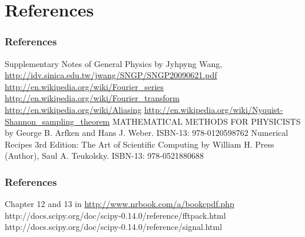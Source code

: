 \documentclass{beamer}
\begin{document}
\section{References}
\begin{frame}
\frametitle{References}
\begin{thebibliography}{7}
 Supplementary Notes of General Physics by Jyhpyng Wang, \url{http://idv.sinica.edu.tw/jwang/SNGP/SNGP20090621.pdf}
 \url{http://en.wikipedia.org/wiki/Fourier_series}
 \url{http://en.wikipedia.org/wiki/Fourier_transform}
 \url{http://en.wikipedia.org/wiki/Aliasing}
 \url{http://en.wikipedia.org/wiki/Nyquist-Shannon_sampling_theorem}
 MATHEMATICAL METHODS FOR PHYSICISTS by George B. Arfken and Hans J. Weber. ISBN-13: 978-0120598762
 Numerical Recipes 3rd Edition: The Art of Scientific Computing by William H. Press  (Author), Saul A. Teukolsky. ISBN-13: 978-0521880688
\end{thebibliography}
\end{frame}
\begin{frame}
\frametitle{References}
\begin{thebibliography}{3}
 Chapter 12 and 13 in \url{http://www.nrbook.com/a/bookcpdf.php}
http://docs.scipy.org/doc/scipy-0.14.0/reference/fftpack.html
http://docs.scipy.org/doc/scipy-0.14.0/reference/signal.html
\end{thebibliography}
\end{frame}
\section{}
\end{document}
